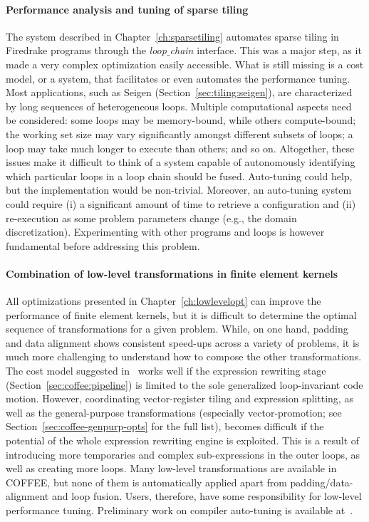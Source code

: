 \paragraph{Performance analysis and tuning of sparse tiling}
The system described in Chapter~\ref{ch:sparsetiling} automates sparse tiling in Firedrake programs through the {\em loop$\_$chain} interface. This was a major step, as it made a very complex optimization easily accessible. What is still missing is a cost model, or a system, that facilitates or even automates the performance tuning. Most applications, such as Seigen (Section~\ref{sec:tiling:seigen}), are characterized by long sequences of heterogeneous loops. Multiple computational aspects need be considered: some loops may be memory-bound, while others compute-bound; the working set size may vary significantly amongst different subsets of loops; a loop may take much longer to execute than others; and so on. Altogether, these issues make it difficult to think of a system capable of autonomously identifying which particular loops in a loop chain should be fused. Auto-tuning could help, but the implementation would be non-trivial. Moreover, an auto-tuning system could require (i) a significant amount of time to retrieve a configuration and (ii) re-execution as some problem parameters change (e.g., the domain discretization). Experimenting with other programs and loops is however fundamental before addressing this problem.


\paragraph{Combination of low-level transformations in finite element kernels}
All optimizations presented in Chapter~\ref{ch:lowlevelopt} can improve the performance of finite element kernels, but it is difficult to determine the optimal sequence of transformations for a given problem. While, on one hand, padding and data alignment shows consistent speed-ups across a variety of problems, it is much more challenging to understand how to compose the other transformations. The cost model suggested in~\cite{Luporini-coffee} works well if the expression rewriting stage (Section~\ref{sec:coffee:pipeline}) is limited to the sole generalized loop-invariant code motion. However, coordinating vector-register tiling and expression splitting, as well as the general-purpose transformations (especially vector-promotion; see Section~\ref{sec:coffee-genpurp-opts} for the full list), becomes difficult if the potential of the whole expression rewriting engine is exploited. This is a result of introducing more temporaries and complex sub-expressions in the outer loops, as well as creating more loops. Many low-level transformations are available in COFFEE, but none of them is automatically applied apart from padding/data-alignment and loop fusion. Users, therefore, have some responsibility for low-level performance tuning. Preliminary work on compiler auto-tuning is available at~\citep{coffee-code}.


